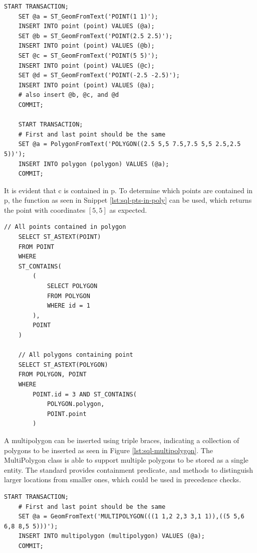 \begin{lstlisting}[caption={Insert four points and one polygon in MySQL.}, label={lst:sql-insert-points}]
	START TRANSACTION;
	SET @a = ST_GeomFromText('POINT(1 1)');
	INSERT INTO point (point) VALUES (@a);
	SET @b = ST_GeomFromText('POINT(2.5 2.5)');
	INSERT INTO point (point) VALUES (@b);
	SET @c = ST_GeomFromText('POINT(5 5)');
	INSERT INTO point (point) VALUES (@c);
	SET @d = ST_GeomFromText('POINT(-2.5 -2.5)');
	INSERT INTO point (point) VALUES (@a);
	# also insert @b, @c, and @d
	COMMIT;

	START TRANSACTION;
	# First and last point should be the same
	SET @a = PolygonFromText('POLYGON((2.5 5,5 7.5,7.5 5,5 2.5,2.5 5))');
	INSERT INTO polygon (polygon) VALUES (@a);
	COMMIT;
\end{lstlisting}

It is evident that c is contained in p. To determine which points are contained in p, the function as seen in Snippet \ref{lst:sql-pts-in-poly} can be used, which returns the point with coordinates $[5, 5]$ as expected.

\begin{lstlisting}[caption={Select points contained in polygon, and all polygons containing a point in MySQL.}, label={lst:sql-pts-in-poly}]
	// All points contained in polygon
	SELECT ST_ASTEXT(POINT)
	FROM POINT
	WHERE
	ST_CONTAINS(
		(
			SELECT POLYGON
			FROM POLYGON
			WHERE id = 1
		),
		POINT
	)

	// All polygons containing point
	SELECT ST_ASTEXT(POLYGON)
	FROM POLYGON, POINT
	WHERE
		POINT.id = 3 AND ST_CONTAINS(
			POLYGON.polygon,
			POINT.point
		)
\end{lstlisting}

A multipolygon can be inserted using triple braces, indicating a collection of polygons to be inserted as seen in Figure \ref{lst:sql-multipolygon}. The MultiPolygon class is able to support multiple polygons to be stored as a single entity. The standard provides containment predicate, and methods to distinguish larger locations from smaller ones, which could be used in precedence checks.

\begin{lstlisting}[caption={Insert one multipolygon in MySQL.}, label={lst:sql-multipolygon}]
	START TRANSACTION;
	# First and last point should be the same
	SET @a = GeomFromText('MULTIPOLYGON(((1 1,2 2,3 3,1 1)),((5 5,6 6,8 8,5 5)))');
	INSERT INTO multipolygon (multipolygon) VALUES (@a);
	COMMIT;
\end{lstlisting}

